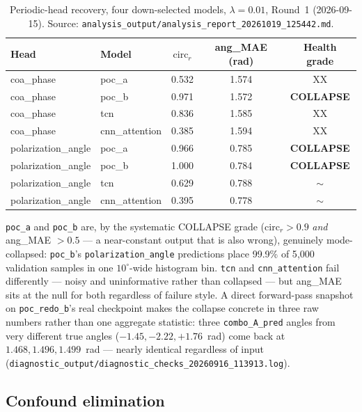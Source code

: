 \begin{table}[tbp]
    \centering
    \caption{Periodic-head recovery, four down-selected models, $\lambda=0.01$, Round~1 (2026-09-15). Source: \texttt{analysis\_output/analysis\_report\_20261019\_125442.md}.}
    \label{tab:phicpsi:redo:headline}
    \small
    \begin{tabular}{@{}llccc@{}}
        \toprule
        Head & Model & $\text{circ}_r$ & ang\_MAE (rad) & Health grade \\
        \midrule
        coa\_phase & poc\_a & 0.532 & 1.574 & XX \\
        coa\_phase & poc\_b & 0.971 & 1.572 & \textbf{COLLAPSE} \\
        coa\_phase & tcn & 0.836 & 1.585 & XX \\
        coa\_phase & cnn\_attention & 0.385 & 1.594 & XX \\
        polarization\_angle & poc\_a & 0.966 & 0.785 & \textbf{COLLAPSE} \\
        polarization\_angle & poc\_b & 1.000 & 0.784 & \textbf{COLLAPSE} \\
        polarization\_angle & tcn & 0.629 & 0.788 & $\sim$ \\
        polarization\_angle & cnn\_attention & 0.395 & 0.778 & $\sim$ \\
        \bottomrule
    \end{tabular}
\end{table}

\texttt{poc\_a} and \texttt{poc\_b} are, by the systematic COLLAPSE grade ($\text{circ}_r > 0.9$ \emph{and} ang\_MAE $>0.5$ --- a near-constant output that is also wrong), genuinely mode-collapsed: \texttt{poc\_b}'s \texttt{polarization\_angle} predictions place 99.9\% of 5{,}000 validation samples in one $10^\circ$-wide histogram bin.
\texttt{tcn} and \texttt{cnn\_attention} fail differently --- noisy and uninformative rather than collapsed --- but ang\_MAE sits at the null for both regardless of failure style.
A direct forward-pass snapshot on \texttt{poc\_redo\_b}'s real checkpoint makes the collapse concrete in three raw numbers rather than one aggregate statistic: three \texttt{combo\_A\_pred} angles from very different true angles ($-1.45, -2.22, +1.76$~rad) come back at $1.468, 1.496, 1.499$~rad --- nearly identical regardless of input (\texttt{diagnostic\_output/diagnostic\_checks\_20260916\_113913.log}).

\subsection{Confound elimination}
\label{sec:phicpsi:confounds}

